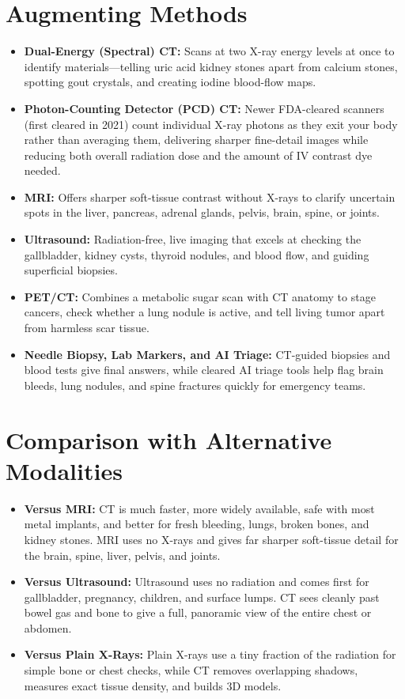 \section{Augmenting Methods}
\begin{itemize}
    \item \textbf{Dual-Energy (Spectral) CT:} Scans at two X-ray energy levels at once to identify materials---telling uric acid kidney stones apart from calcium stones, spotting gout crystals, and creating iodine blood-flow maps.
    \item \textbf{Photon-Counting Detector (PCD) CT:} Newer FDA-cleared scanners (first cleared in 2021) count individual X-ray photons as they exit your body rather than averaging them, delivering sharper fine-detail images while reducing both overall radiation dose and the amount of IV contrast dye needed.
    \item \textbf{MRI:} Offers sharper soft-tissue contrast without X-rays to clarify uncertain spots in the liver, pancreas, adrenal glands, pelvis, brain, spine, or joints.
    \item \textbf{Ultrasound:} Radiation-free, live imaging that excels at checking the gallbladder, kidney cysts, thyroid nodules, and blood flow, and guiding superficial biopsies.
    \item \textbf{PET/CT:} Combines a metabolic sugar scan with CT anatomy to stage cancers, check whether a lung nodule is active, and tell living tumor apart from harmless scar tissue.
    \item \textbf{Needle Biopsy, Lab Markers, and AI Triage:} CT-guided biopsies and blood tests give final answers, while cleared AI triage tools help flag brain bleeds, lung nodules, and spine fractures quickly for emergency teams.
\end{itemize}

\section{Comparison with Alternative Modalities}
\begin{itemize}
    \item \textbf{Versus MRI:} CT is much faster, more widely available, safe with most metal implants, and better for fresh bleeding, lungs, broken bones, and kidney stones. MRI uses no X-rays and gives far sharper soft-tissue detail for the brain, spine, liver, pelvis, and joints.
    \item \textbf{Versus Ultrasound:} Ultrasound uses no radiation and comes first for gallbladder, pregnancy, children, and surface lumps. CT sees cleanly past bowel gas and bone to give a full, panoramic view of the entire chest or abdomen.
    \item \textbf{Versus Plain X-Rays:} Plain X-rays use a tiny fraction of the radiation for simple bone or chest checks, while CT removes overlapping shadows, measures exact tissue density, and builds 3D models.
\end{itemize}

